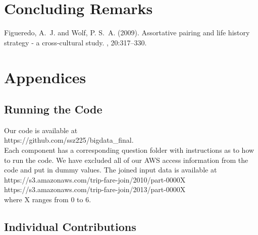 \documentclass[twoside]{article}
\begin{document}
\begin{multicols}{2}
\section{Concluding Remarks}



\begin{thebibliography}{99} %

Figueredo, A.~J. and Wolf, P. S.~A. (2009).
\newblock Assortative pairing and life history strategy - a cross-cultural
  study.
, 20:317--330.
 
\end{thebibliography}


\section{Appendices}

\subsection{Running the Code}

Our code is available at \\

\noindent https://github.com/ssz225/bigdata\_final.\\



Each component has a corresponding question folder with instructions as to how to run the code. We have excluded all of our AWS access information from the code and put in dummy values.  The joined input data is available at \\

\noindent https://s3.amazonaws.com/trip-fare-join/2010/part-0000X
\noindent https://s3.amazonaws.com/trip-fare-join/2013/part-0000X
\\

\noindent where X ranges from 0 to 6.


\subsection{Individual Contributions}




\end{multicols}
\end{document}
